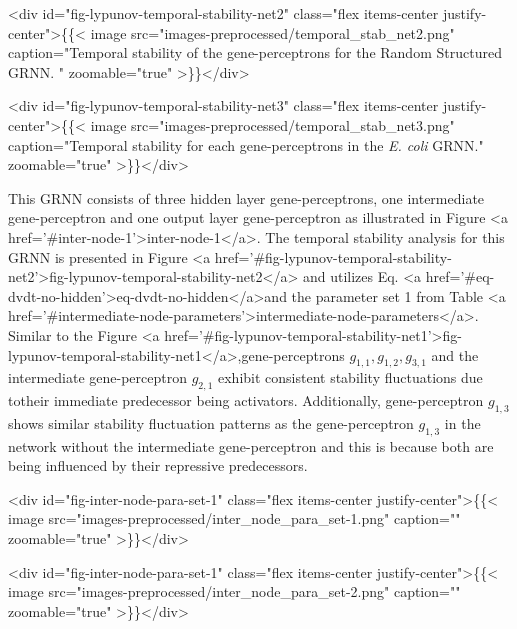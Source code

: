 \documentclass[twocolumn]{biophys-new}
\begin{document}
{{<div id="fig-lypunov-temporal-stability-net2" class="flex items-center justify-center">\{\{< image src="images-preprocessed/temporal_stab_net2.png" caption="Temporal stability of the gene-perceptrons for the Random Structured GRNN. \vspace{-0.5em}" zoomable="true" >\}\}</div>



<div id="fig-lypunov-temporal-stability-net3" class="flex items-center justify-center">\{\{< image src="images-preprocessed/temporal_stab_net3.png" caption="Temporal stability for each gene-perceptrons in the \emph{E. coli} GRNN." zoomable="true" >\}\}</div>


This GRNN consists of three hidden layer gene-perceptrons, one intermediate gene-perceptron and one output layer gene-perceptron as illustrated in Figure <a href='#inter-node-1'>inter-node-1</a>. 
The temporal stability analysis for this GRNN is presented in Figure <a href='#fig-lypunov-temporal-stability-net2'>fig-lypunov-temporal-stability-net2</a> and utilizes Eq. <a href='#eq-dvdt-no-hidden'>eq-dvdt-no-hidden</a>and the parameter set 1 from Table <a href='#intermediate-node-parameters'>intermediate-node-parameters</a>. Similar to the Figure <a href='#fig-lypunov-temporal-stability-net1'>fig-lypunov-temporal-stability-net1</a>,gene-perceptrons $g_{1,1}, g_{1,2}, g_{3,1}$ and the intermediate gene-perceptron $g_{2,1}$ exhibit consistent stability fluctuations due totheir immediate predecessor being activators. Additionally, gene-perceptron $g_{1,3}$ shows similar stability fluctuation patterns as the gene-perceptron $g_{1,3}$ in the network without the intermediate gene-perceptron and this is because both are being influenced by their repressive predecessors.

<div id="fig-inter-node-para-set-1" class="flex items-center justify-center">\{\{< image src="images-preprocessed/inter_node_para_set-1.png" caption="" zoomable="true" >\}\}</div>


<div id="fig-inter-node-para-set-1" class="flex items-center justify-center">\{\{< image src="images-preprocessed/inter_node_para_set-2.png" caption="" zoomable="true" >\}\}</div>



}}
\end{document}
